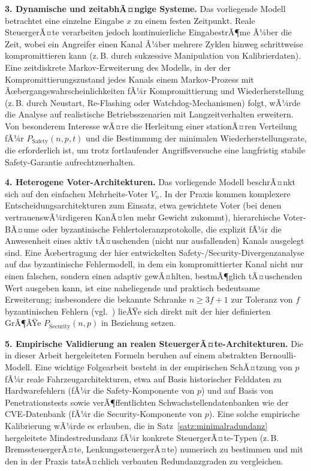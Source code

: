 ﻿\documentclass[a4paper,12pt]{article}
\theoremstyle{definition}
\begin{document}
\textbf{3. Dynamische und zeitabhÃ¤ngige Systeme.} Das vorliegende Modell betrachtet eine einzelne Eingabe $x$ zu einem festen Zeitpunkt. Reale SteuergerÃ¤te verarbeiten jedoch kontinuierliche EingabestrÃ¶me Ã¼ber die Zeit, wobei ein Angreifer einen Kanal Ã¼ber mehrere Zyklen hinweg schrittweise kompromittieren kann (z.\,B. durch sukzessive Manipulation von Kalibrierdaten). Eine zeitdiskrete Markov-Erweiterung des Modells, in der der Kompromittierungszustand jedes Kanals einem Markov-Prozess mit Ãœbergangswahrscheinlichkeiten fÃ¼r Kompromittierung und Wiederherstellung (z.\,B. durch Neustart, Re-Flashing oder Watchdog-Mechanismen) folgt, wÃ¼rde die Analyse auf realistische Betriebsszenarien mit Langzeitverhalten erweitern. Von besonderem Interesse wÃ¤re die Herleitung einer stationÃ¤ren Verteilung fÃ¼r $P_{\mathrm{Safety}}(n,p,t)$ und die Bestimmung der minimalen Wiederherstellungsrate, die erforderlich ist, um trotz fortlaufender Angriffsversuche eine langfristig stabile Safety-Garantie aufrechtzuerhalten.

\textbf{4. Heterogene Voter-Architekturen.} Das vorliegende Modell beschrÃ¤nkt sich auf den einfachen Mehrheits-Voter $V_n$. In der Praxis kommen komplexere Entscheidungsarchitekturen zum Einsatz, etwa gewichtete Voter (bei denen vertrauenswÃ¼rdigeren KanÃ¤len mehr Gewicht zukommt), hierarchische Voter-BÃ¤ume oder byzantinische Fehlertoleranzprotokolle, die explizit fÃ¼r die Anwesenheit eines aktiv tÃ¤uschenden (nicht nur ausfallenden) Kanals ausgelegt sind. Eine Ãœbertragung der hier entwickelten Safety-/Security-Divergenzanalyse auf das byzantinische Fehlermodell, in dem ein kompromittierter Kanal nicht nur einen falschen, sondern einen adaptiv gewÃ¤hlten, bestmÃ¶glich tÃ¤uschenden Wert ausgeben kann, ist eine naheliegende und praktisch bedeutsame Erweiterung; insbesondere die bekannte Schranke $n \geq 3f+1$ zur Toleranz von $f$ byzantinischen Fehlern (vgl.\ \cite{lamport1982}) lieÃŸe sich direkt mit der hier definierten GrÃ¶ÃŸe $P_{\mathrm{Security}}(n,p)$ in Beziehung setzen.

\textbf{5. Empirische Validierung an realen SteuergerÃ¤te-Architekturen.} Die in dieser Arbeit hergeleiteten Formeln beruhen auf einem abstrakten Bernoulli-Modell. Eine wichtige Folgearbeit besteht in der empirischen SchÃ¤tzung von $p$ fÃ¼r reale Fahrzeugarchitekturen, etwa auf Basis historischer Felddaten zu Hardwarefehlern (fÃ¼r die Safety-Komponente von $p$) und auf Basis von Penetrationstests sowie verÃ¶ffentlichten Schwachstellendatenbanken wie der CVE-Datenbank (fÃ¼r die Security-Komponente von $p$). Eine solche empirische Kalibrierung wÃ¼rde es erlauben, die in Satz~\ref{satz:minimalradundanz} hergeleitete Mindestredundanz fÃ¼r konkrete SteuergerÃ¤te-Typen (z.\,B. BremssteuergerÃ¤te, LenkungssteuergerÃ¤te) numerisch zu bestimmen und mit den in der Praxis tatsÃ¤chlich verbauten Redundanzgraden zu vergleichen.
\end{document}
